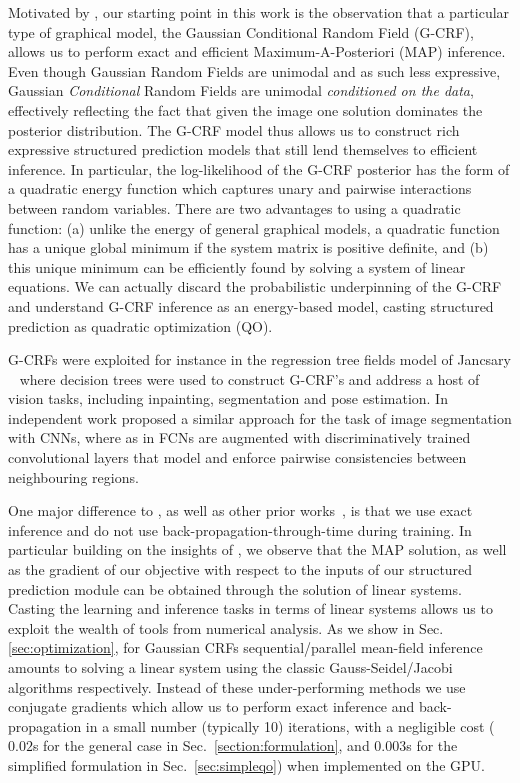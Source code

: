 \documentclass[runningheads]{llncs}
\begin{document}
Motivated by \cite{TappenLAF07,rtf}, our starting point in this work is the observation that a particular type of graphical model, the Gaussian Conditional Random Field (G-CRF), 
allows us to perform exact and efficient Maximum-A-Posteriori (MAP) inference. 
Even though Gaussian Random Fields are unimodal and as such less expressive, Gaussian \emph{Conditional} Random Fields are unimodal \emph{conditioned on the data}, effectively
reflecting the fact that given the image one solution dominates the posterior distribution.
The G-CRF model thus allows us to construct rich expressive structured prediction models that still lend
themselves to efficient inference. In particular, the log-likelihood of the G-CRF posterior has the form of a quadratic energy function which captures unary and pairwise interactions between random
variables. There are two advantages to using a quadratic function: (a) unlike the energy of general graphical models, a quadratic  function has a unique global minimum if the system matrix is
positive definite, and (b) this unique minimum can be efficiently found by solving a system of linear equations.
We can actually discard the probabilistic underpinning of the G-CRF and understand G-CRF inference as an energy-based model, casting structured prediction as quadratic optimization (QO). 

G-CRFs were exploited for instance in the regression tree fields model of Jancsary \etal~\cite{rtf}  where decision trees were used to construct G-CRF's and address a host of  vision tasks, including inpainting, segmentation and pose estimation.
In independent work \cite{Vemulapalli_2016_CVPR} proposed a similar approach for the task of image segmentation with CNNs, where 
as  in \cite{Adelaide,DPN,vu2015context} FCNs are augmented with discriminatively trained convolutional layers that model and enforce pairwise consistencies between neighbouring regions.

One major difference to \cite{Vemulapalli_2016_CVPR}, as well as other prior works~\cite{crfrnn,deeplab1,vemulapalli,Adelaide,DPN}, is that
we use exact inference and do not use back-propagation-through-time
during training. In particular building on the insights of \cite{TappenLAF07,rtf}, we observe that the MAP solution, as well as  the gradient of our objective with respect to the inputs of our structured prediction module can be obtained through the solution of linear systems.
Casting the learning and inference tasks in terms of linear systems allows us to exploit the wealth of tools from numerical analysis. As we show in Sec.~ \ref{sec:optimization}, for Gaussian CRFs sequential/parallel mean-field inference amounts to solving a linear system using the classic Gauss-Seidel/Jacobi algorithms respectively. Instead of these under-performing methods we use conjugate gradients which allow us to perform exact inference and back-propagation in a small 
number (typically 10) iterations, with a negligible cost ($0.02$s for the general case in Sec.~\ref{section:formulation}, and $0.003$s for the simplified formulation in Sec.~\ref{sec:simpleqo}) when implemented on the GPU. 
\end{document}

